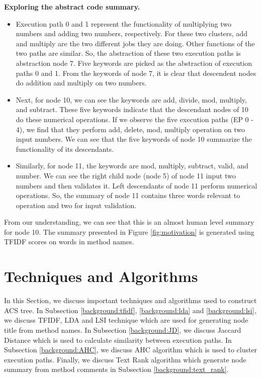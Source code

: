 \textbf{Exploring the abstract code summary.}
\begin{itemize}
    \item Execution path 0 and 1 represent the functionality of multiplying two numbers and adding two numbers, respectively. For these two clusters, add and multiply are the two different jobs they are doing. Other functions of the two paths are similar. So, the abstraction of these two execution paths is abstraction node 7. Five keywords are picked as the abstraction of execution paths 0 and 1. From the keywords of node 7, it is clear that descendent nodes do addition and multiply on two numbers.
    \item Next, for node 10, we can see the keywords are add, divide, mod, multiply, and subtract. These five keywords indicate that the descendant nodes of 10 do these numerical operations. If we observe the five execution paths (EP 0 - 4), we find that they perform add, delete, mod, multiply operation on two input numbers. We can see that the five keywords of node 10 summarize the functionality of its descendants.
    \item Similarly, for node 11, the keywords are mod, multiply, subtract, valid, and number. We can see the right child node (node 5) of node 11 input two numbers and then validates it. Left descendants of node 11 perform numerical operations. So, the summary of node 11 contains three words relevant to operation and two for input validation.
\end{itemize}
   From our understanding, we can see that this is an almost human level summary for node 10. The summary presented in Figure \ref{fig:motivation} is generated using TFIDF scores on words in method names. 

\section{ Techniques and Algorithms}
\label{background:techniques}
In this Section, we discuss important techniques and algorithms used to construct ACS tree. In Subsection \ref{background:tfidf}, \ref{background:lda} and \ref{background:lsi}, we discuss TFIDF, LDA and LSI technique which are used for generating node title from method names. In Subsection \ref{background:JD}, we discuss Jaccard Distance which is used to calculate similarity between execution paths. In Subsection \ref{background:AHC}, we discuss AHC algorithm which is used to cluster execution paths. Finally, we discuss Text Rank algorithm which generate node summary from method comments in Subsection \ref{background:text_rank}.


